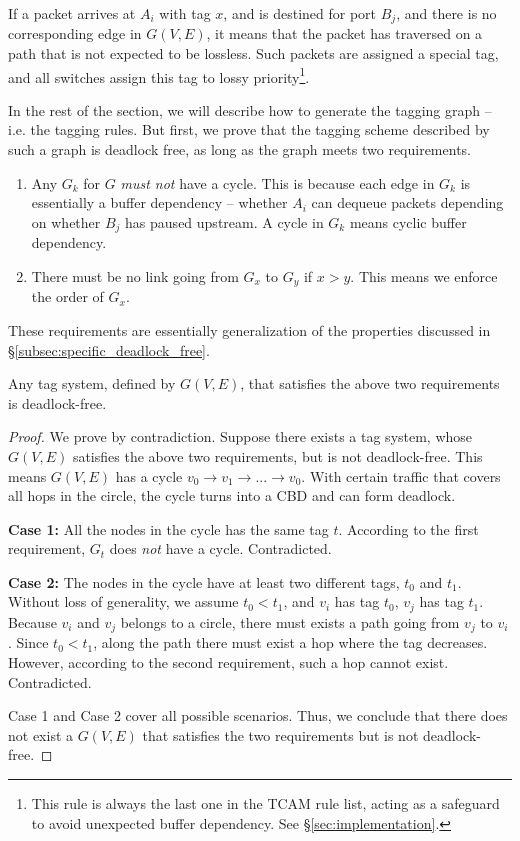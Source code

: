 If a packet arrives at $A_i$ with tag $x$, and is destined for port $B_j$, and
there is no corresponding edge in $G(V,E)$, it means that the packet has
traversed on a path that is not expected to be lossless.  Such packets are
assigned a special tag, and all switches assign this tag to lossy
priority\footnote{This rule is always the last one in the 
TCAM rule list, acting as a safeguard to avoid unexpected buffer dependency.
See \S\ref{sec:implementation}.}.

In the rest of the section, we will describe how to generate the tagging graph
-- i.e. the tagging rules. But first, we prove that the tagging scheme described
by such a graph is deadlock free, as long as the graph meets two requirements.

\begin{enumerate} 

		\item  Any $G_k$ for $G$ {\em must not} have a cycle.  This is
				because each edge in $G_k$ is essentially a buffer dependency --
				whether $A_i$ can dequeue packets depending on whether $B_j$ has
				paused upstream. A cycle in $G_k$ means cyclic buffer
				dependency.  
		\item There must be no link going from
				$G_x$ to $G_y$ if $x>y$.  This means we enforce the order of
				$G_x$.
\end{enumerate}

These requirements are essentially generalization of the properties
discussed in \S\ref{subsec:specific_deadlock_free}. 

\begin{theorem}
Any tag system, defined by $G(V,E)$, that satisfies the above two requirements is deadlock-free.
\end{theorem}

\begin{proof}
We prove by contradiction. Suppose there exists a tag system,
whose $G(V,E)$ satisfies the above two requirements, but is not deadlock-free. This means
$G(V,E)$ has a cycle $v_0 \rightarrow v_1 \rightarrow ... \rightarrow v_0$. With certain 
traffic that covers all hops in the circle, the cycle turns into a CBD and can form deadlock.

\textbf{Case 1:} All the nodes in the cycle has the same tag $t$. According to
the first requirement, $G_t$ does {\em not} have a cycle. Contradicted.

\textbf{Case 2:} The nodes in the cycle have at least two different tags, $t_0$ and $t_1$.
Without loss of generality, we assume $t_0 < t_1$, and $v_i$ has tag $t_0$, $v_j$
has tag $t_1$. Because $v_i$ and $v_j$ belongs to a circle, there must exists 
a path going from $v_j$ to $v_i$. Since $t_0 < t_1$, along the path there must exist 
a hop where the tag decreases. However, according to the second requirement, such a hop 
cannot exist. Contradicted.

Case 1 and Case 2 cover all possible scenarios. Thus, we conclude that there does not 
exist a $G(V,E)$ that satisfies the two requirements but is not deadlock-free.
\end{proof}


